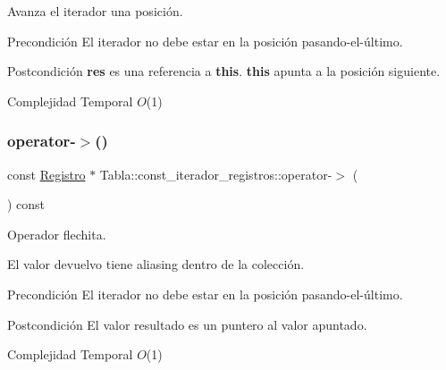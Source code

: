 Avanza el iterador una posición. 

\begin{DoxyPrecond}{Precondición}
El iterador no debe estar en la posición pasando-\/el-\/último. 
\end{DoxyPrecond}
\begin{DoxyPostcond}{Postcondición}
{\bfseries res} es una referencia a {\bfseries this}. {\bfseries this} apunta a la posición siguiente.
\end{DoxyPostcond}

\begin{DoxyDescription}
\item[Complejidad Temporal]$O$(1)
\end{DoxyDescription}\mbox{\label{classTabla_1_1const__iterador__registros_aa3ceabec92850b9bd3b4d5d704390aba}} 
\subsubsection{\texorpdfstring{operator-\/$>$()}{operator->()}}
{\footnotesize\ttfamily const \mbox{\hyperlink{classRegistro}{Registro}} $\ast$ Tabla\+::const\+\_\+iterador\+\_\+registros\+::operator-\/$>$ (\begin{DoxyParamCaption}{ }\end{DoxyParamCaption}) const}



Operador flechita. 

El valor devuelvo tiene aliasing dentro de la colección.

\begin{DoxyPrecond}{Precondición}
El iterador no debe estar en la posición pasando-\/el-\/último. 
\end{DoxyPrecond}
\begin{DoxyPostcond}{Postcondición}
El valor resultado es un puntero al valor apuntado.
\end{DoxyPostcond}

\begin{DoxyDescription}
\item[Complejidad Temporal]$O$(1)
\end{DoxyDescription}\mbox{\label{classTabla_1_1const__iterador__registros_acca3075015ddaa2e02fd9c79db55e70d}} 
